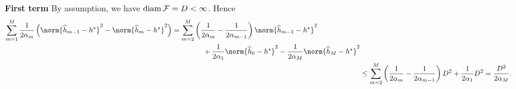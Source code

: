 \textbf{First term }
By assumption, we have $ \operatorname{diam} \mathcal{F} = D < \infty $.
Hence
\begin{align*}
    \begin{split}
        \sum_{ m=1 }^{ M } \frac{ 1 }{ 2 \alpha_{ m } } \left(
            \norm{ \hat{ h }_{ m-1 } - \hstar }^2
            -
            \norm{ \hat{ h }_{ m } - \hstar }^2
        \right)
        &= \sum_{ m=2 }^{ M } \left(
            \frac{ 1 }{ 2 \alpha_{ m } } - \frac{ 1 }{ 2 \alpha_{ m-1 } } 
        \right) \norm{ \hat{ h }_{ m-1 } - \hstar }^2 \\
        &\hspace{1.5cm}+ \frac{ 1 }{ 2 \alpha_{ 1 } } \norm{ \hat{ h }_{ 0 } - \hstar }^2 - \frac{ 1 }{ 2 \alpha_{ M } } \norm{ \hat{ h }_{ M } - \hstar }^2
    \end{split} \\
    &\leq 
    \sum_{ m=2 }^{ M } \left(
        \frac{ 1 }{ 2 \alpha_{ m } } - \frac{ 1 }{ 2 \alpha_{ m-1 } } 
    \right) D^2 + \frac{ 1 }{ 2 \alpha_{ 1 } } D^2 = \frac{ D^2 }{ 2 \alpha_{ M } }
.\end{align*}

